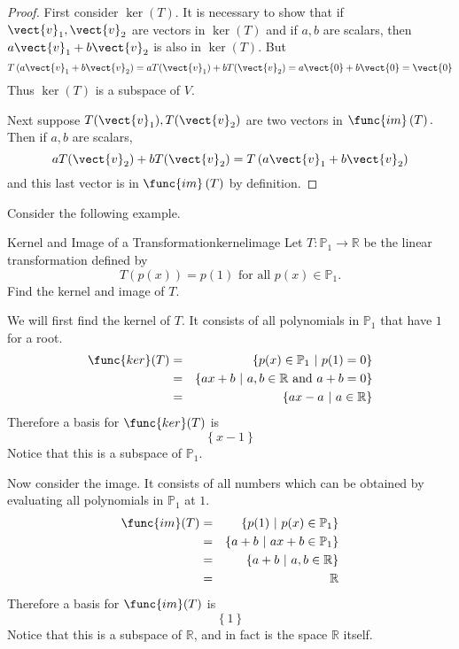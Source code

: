 \begin{proof}
First consider $\ker \left( T\right) .$ It is necessary to
show that if $\vect{v}_{1},\vect{v}_{2}$ are vectors in $\ker \left( T\right) $
and if $a,b$ are scalars, then $a\vect{v}_{1}+b\vect{v}_{2}$ is also in $\ker
\left( T\right) .$ But 
\begin{equation*}
T\left( a\vect{v}_{1}+b\vect{v}_{2}\right) =aT(\vect{v}_{1})+bT(\vect{v}_{2})=a\vect{0}+b\vect{0}=\vect{0}
\end{equation*}
Thus $\ker \left( T\right) $ is a subspace of $V$.

Next suppose $T(\vect{v}_{1}),T(\vect{v}_{2})$ are two vectors in $\func{im}\left(
T\right) .$ Then if $a,b$ are scalars, 
\begin{equation*}
aT(\vect{v}_{2})+bT(\vect{v}_{2})=T\left( a\vect{v}_{1}+b\vect{v}_{2}\right)
\end{equation*}
and this last vector is in $\func{im}\left( T\right) $ by definition. 
\end{proof}

Consider the following example.

\begin{example}{Kernel and Image of a Transformation}{kernelimage}
Let $T:\mathbb{P}_1\to\mathbb{R}$ be the linear transformation defined by
\[ T(p(x))=p(1)\mbox{ for all } p(x)\in \mathbb{P}_1.\]
Find the kernel and image of $T$.
\end{example}

\begin{solution}
We will first find the kernel of $T$. It consists of all polynomials in $\mathbb{P}_1$ that have $1$ for a root. 
\begin{eqnarray*}
\func{ker}(T) & = & \{ p(x)\in \mathbb{P}_1 ~|~ p(1)=0\} \\
& = & \{ ax+b ~|~ a,b\in\mathbb{R} \mbox{ and }a+b=0\} \\
& = & \{ ax-a ~|~ a\in\mathbb{R} \}
\end{eqnarray*}
Therefore a basis for $\func{ker}(T)$ is 
\[
\left\{ x-1 \right\}
\]
Notice that this is a subspace of $\mathbb{P}_1$. 

Now consider the image. It consists of all numbers which can be obtained by evaluating all polynomials in $\mathbb{P}_1$ at $1$. 
\begin{eqnarray*}
\func{im}(T) & = & \{ p(1) ~|~ p(x)\in \mathbb{P}_1 \} \\
 & = & \{ a+b ~|~ ax+b\in \mathbb{P}_1 \} \\
 & = & \{ a+b ~|~ a,b\in\mathbb{R} \}\\
 & = & \mathbb{R}
\end{eqnarray*}
Therefore a basis for $\func{im}(T)$ is 
\[
\left\{ 1 \right\}
\]
Notice that this is a subspace of $\mathbb{R}$, and in fact is the space $\mathbb{R}$ itself. 
\end{solution}


